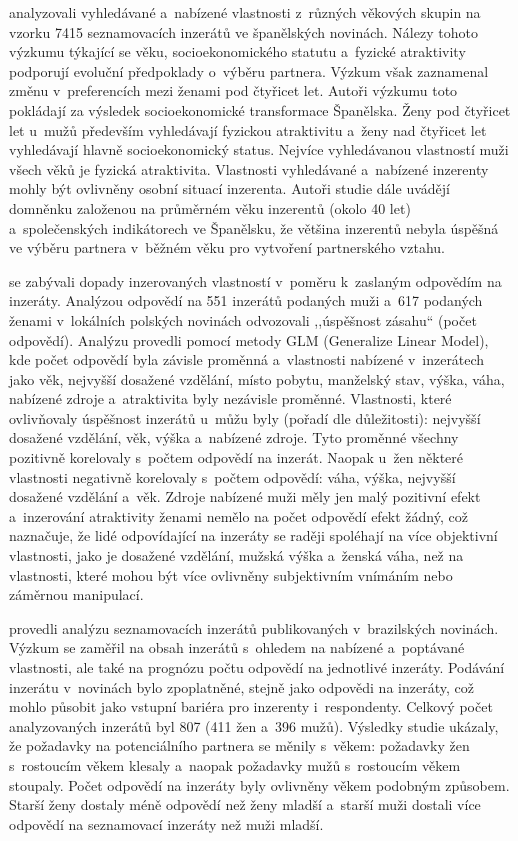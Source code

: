 \documentclass[a4paper, 12pt, notitlepage, oneside, numbers=noenddot]{report}
\begin{document}
\citet{Gil-BurmanPelaezSanchez2002} analyzovali vyhledávané a~nabízené
vlastnosti z~různých věkových skupin na vzorku 7415 seznamovacích
inzerátů ve španělských novinách. Nálezy tohoto výzkumu týkající se
věku, socioekonomického statutu a~fyzické atraktivity podporují
evoluční předpoklady o~výběru partnera. Výzkum však zaznamenal změnu
v~pre\-fe\-ren\-cích mezi ženami pod čtyřicet let. Autoři výzkumu toto
pokládají za výsledek so\-cio\-eko\-no\-mické transformace Španělska. Ženy pod
čtyřicet let u~mužů především vyhledávají fyzickou atraktivitu a~ženy
nad čtyřicet let vyhledávají hlavně socioekonomický status. Nejvíce
vyhledávanou vlastností muži všech věků je fyzická atraktivita.
Vlastnosti vyhledávané a~nabízené inzerenty mohly být ovlivněny osobní
situací inzerenta. Autoři studie dále uvádějí domněnku založenou na
průměrném věku inzerentů (okolo 40 let) a~společenských indikátorech
ve Španělsku, že většina inzerentů nebyla úspěšná ve výběru partnera
v~běžném věku pro vytvoření partnerského vztahu.

\citet{PawlowskiKoziel2002} se zabývali dopady inzerovaných
vlastností v~poměru k~zaslaným odpovědím na inzeráty.  Analýzou
odpovědí na 551 inzerátů podaných muži a~617 podaných ženami
v~lokálních polských novinách odvozovali ,,úspěšnost zásahu`` (počet
odpovědí). Analýzu provedli pomocí metody GLM (Generalize Linear
Model), kde počet odpovědí byla závisle proměnná a~vlastnosti nabízené
v~inzerátech jako věk, nejvyšší dosažené vzdělání, místo pobytu,
manželský stav, výška, váha, nabízené zdroje a~atraktivita byly
nezávisle proměnné. Vlastnosti, které ovlivňovaly úspěšnost inzerátů
u~můžu byly (pořadí dle důležitosti): nejvyšší dosažené vzdělání, věk,
výška a~nabízené zdroje. Tyto proměnné všechny pozitivně korelovaly
s~počtem odpovědí na inzerát. Naopak u~žen některé vlastnosti
negativně korelovaly s~počtem odpovědí: váha, výška, nejvyšší dosažené
vzdělání a~věk. Zdroje nabízené muži měly jen malý pozitivní efekt
a~inzerování atraktivity ženami nemělo na počet odpovědí efekt žádný,
což naznačuje, že lidé odpovídající na inzeráty se raději spoléhají na
více objektivní vlastnosti, jako je dosažené vzdělání, mužská výška
a~ženská váha, než na vlastnosti, které mohou být více ovlivněny
subjektivním vnímáním nebo záměrnou manipulací.

 provedli analýzu seznamovacích inzerátů
publikovaných v~brazilských novinách.  Výzkum se zaměřil na obsah
inzerátů s~ohledem na nabízené a~poptávané vlastnosti, ale také na
prognózu počtu odpovědí na jednotlivé inzeráty.  Podávání inzerátu
v~novinách bylo zpoplatněné, stejně jako odpovědi na inzeráty, což
mohlo působit jako vstupní bariéra pro inzerenty i~respondenty.
Celkový počet analyzovaných inzerátů byl 807 (411 žen a~396 mužů).
Výsledky studie ukázaly, že požadavky na potenciálního partnera se
měnily s~věkem: požadavky žen s~rostoucím věkem klesaly a~naopak
požadavky mužů s~rostoucím věkem stoupaly.  Počet odpovědí na inzeráty
byly ovlivněny věkem podobným způsobem.  Starší ženy dostaly méně
odpovědí než ženy mladší a~starší muži dostali více odpovědí na
seznamovací inzeráty než muži mladší.
\end{document}
